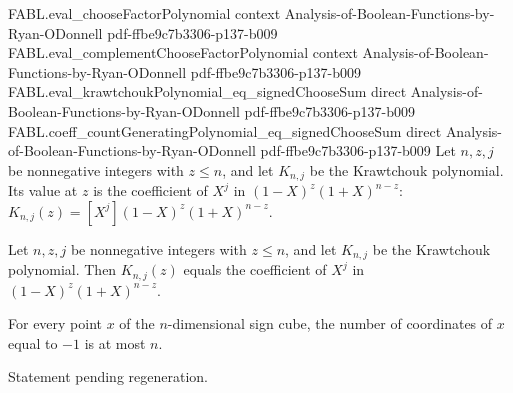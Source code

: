 \begin{theorem}
\proofstep
  {FABL.eval_chooseFactorPolynomial}
  {context}
  {Analysis-of-Boolean-Functions-by-Ryan-ODonnell}
  {pdf-ffbe9c7b3306-p137-b009}
\proofstep
  {FABL.eval_complementChooseFactorPolynomial}
  {context}
  {Analysis-of-Boolean-Functions-by-Ryan-ODonnell}
  {pdf-ffbe9c7b3306-p137-b009}
\proofstep
  {FABL.eval_krawtchoukPolynomial_eq_signedChooseSum}
  {direct}
  {Analysis-of-Boolean-Functions-by-Ryan-ODonnell}
  {pdf-ffbe9c7b3306-p137-b009}
\proofstep
  {FABL.coeff_countGeneratingPolynomial_eq_signedChooseSum}
  {direct}
  {Analysis-of-Boolean-Functions-by-Ryan-ODonnell}
  {pdf-ffbe9c7b3306-p137-b009}
Let $n,z,j$ be nonnegative integers with $z\le n$, and let $K_{n,j}$ be the Krawtchouk
polynomial. Its value at $z$ is the coefficient of $X^j$ in $(1-X)^z(1+X)^{n-z}$:
$K_{n,j}(z)=[X^j](1-X)^z(1+X)^{n-z}$.
\end{theorem}

\begin{theorem}
\label{FABL.eval_krawtchoukPolynomial_eq_coeff_countGenerating}
\leanok
{}
Let $n,z,j$ be nonnegative integers with $z\le n$, and let $K_{n,j}$ be the Krawtchouk
polynomial. Then $K_{n,j}(z)$ equals the coefficient of $X^j$ in $(1-X)^z(1+X)^{n-z}$.
\end{theorem}

\begin{theorem}
\label{FABL.negativeCoordinateCount_le}
\leanok
{}
For every point $x$ of the $n$-dimensional sign cube, the number of coordinates of $x$
equal to $-1$ is at most $n$.
\end{theorem}

\begin{theorem}
\label{FABL.krawtchoukGeneratingPolynomial_eq_negativeCount}
\leanok
{}
Statement pending regeneration.
\end{theorem}

